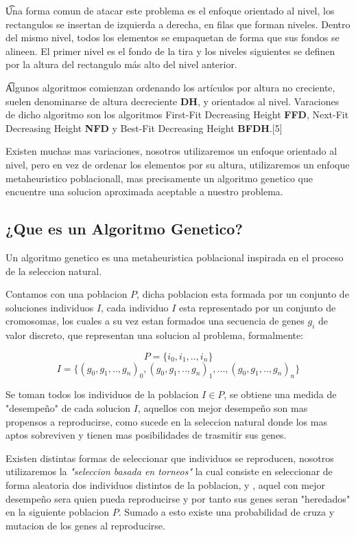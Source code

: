 \documentclass[10pt]{article}
\begin{document}
\t Una forma comun de atacar este problema es el enfoque orientado al nivel, los rectangulos se insertan de izquierda a derecha, en filas que forman niveles. Dentro del mismo nivel, todos los elementos se empaquetan de forma que sus fondos se alineen. El primer nivel es el fondo de la tira y los niveles siguientes se definen por la altura del rectangulo más alto del nivel anterior.
 
\t Algunos algoritmos comienzan ordenando los artículos por altura no creciente, suelen denominarse de altura decreciente \textbf{DH}, y orientados al nivel. Varaciones de dicho algoritmo son los algoritmos First-Fit Decreasing Height \textbf{FFD}, Next-Fit Decreasing Height \textbf{NFD} y Best-Fit Decreasing Height \textbf{BFDH}.[5]

Existen muchas mas variaciones, nosotros utilizaremos un enfoque orientado al nivel, pero en vez de ordenar los elementos por su altura, utilizaremos un enfoque metaheuristico poblacionall, mas precisamente un algoritmo genetico que encuentre una solucion aproximada aceptable a nuestro problema.

\subsection{¿Que es un Algoritmo Genetico?}

Un algoritmo genetico es una metaheuristica poblacional inspirada en el proceso de la seleccion natural.

Contamos con una poblacion $P$, dicha poblacion esta formada por un conjunto de soluciones individuos $I$, cada individuo $I$ esta representado por un conjunto de cromosomas, los cuales a su vez estan formados una secuencia de genes $g_i$ de valor discreto, que representan una solucion al problema, formalmente:

$$P =\{i_0,i_1,..,i_n\}$$
$$I =\{(g_0,g_1,..,g_n)_0,(g_0,g_1,..,g_n)_1,...,(g_0,g_1,..,g_n)_n\}$$

Se toman todos los individuos de la poblacion $I \in P$, se obtiene una medida de "desempeño" de cada solucion $I$, aquellos con mejor desempeño son mas propensos a reproducirse, como sucede en la seleccion natural donde los mas aptos sobreviven y tienen mas posibilidades de trasmitir sus genes.

Existen distintas formas de seleccionar que individuos se reproducen, nosotros utilizaremos la \textit{"seleccion basada en torneos"} la cual consiste en seleccionar de forma aleatoria dos individuos distintos de la poblacion, y , aquel con mejor desempeño sera quien pueda reproducirse y por tanto sus genes seran "heredados" en la siguiente poblacion $P$. Sumado a esto existe una probabilidad de cruza y mutacion de los genes al reproducirse.
\end{document}
